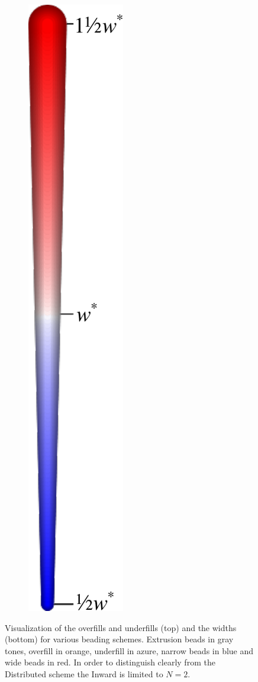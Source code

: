 \begin{figure}
\begin{subfigure}{.04\columnwidth}
\includegraphics[height=\figheight]{sources-validation-gMAT-example-widths-legend.pdf}
\end{subfigure}
\caption{
Visualization of the overfills and underfills (top) and the widths (bottom) for various beading schemes.
Extrusion beads in gray tones,
overfill in orange,
underfill in azure,
narrow beads in blue
and wide beads in red.
{In order to distinguish clearly from the Distributed scheme the Inward is limited to $N=2$.}
}
\label{visualized_accuracy}
\end{figure}





